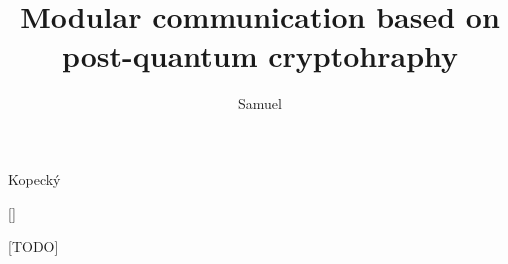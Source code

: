 
\usepackage[
  english,			%
	semestral,		%
  center,			%
]{thesis}   %


\author[Bc.]{Samuel}{Kopecký}


[]

[TODO]

\title{Modular communication based on post-quantum cryptohraphy}

